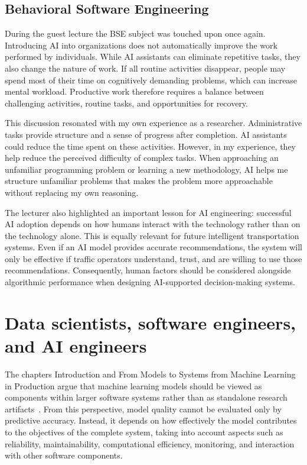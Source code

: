 \documentclass{article}
\begin{document}
\subsection{Behavioral Software Engineering}
During the guest lecture the BSE subject was touched upon once again. 
Introducing AI into organizations does not automatically improve the work performed by individuals. 
While AI assistants can eliminate repetitive tasks, they also change the nature of work. 
If all routine activities disappear, people may spend most of their time on cognitively demanding problems, which can increase mental workload. 
Productive work therefore requires a balance between challenging activities, routine tasks, and opportunities for recovery. 

This discussion resonated with my own experience as a researcher. 
Administrative tasks provide structure and a sense of progress after completion. 
AI assistants could reduce the time spent on these activities. 
However, in my experience, they help reduce the perceived difficulty of complex tasks. 
When approaching an unfamiliar programming problem or learning a new methodology, AI helps me structure unfamiliar problems that makes the problem more approachable without replacing my own reasoning. 

The lecturer also highlighted an important lesson for AI engineering: successful AI adoption depends on how humans interact with the technology rather than on the technology alone. 
This is equally relevant for future intelligent transportation systems. 
Even if an AI model provides accurate recommendations, the system will only be effective if traffic operators understand, trust, and are willing to use those recommendations. 
Consequently, human factors should be considered alongside algorithmic performance when designing AI-supported decision-making systems.

\section{Data scientists, software engineers, and AI engineers}

The chapters Introduction and From Models to Systems from Machine Learning in Production argue that machine learning models should be viewed as components within larger software systems rather than as standalone research artifacts~\cite{Kastner2025}. 
From this perspective, model quality cannot be evaluated only by predictive accuracy. 
Instead, it depends on how effectively the model contributes to the objectives of the complete system, taking into account aspects such as reliability, maintainability, computational efficiency, monitoring, and interaction with other software components.
\end{document}
